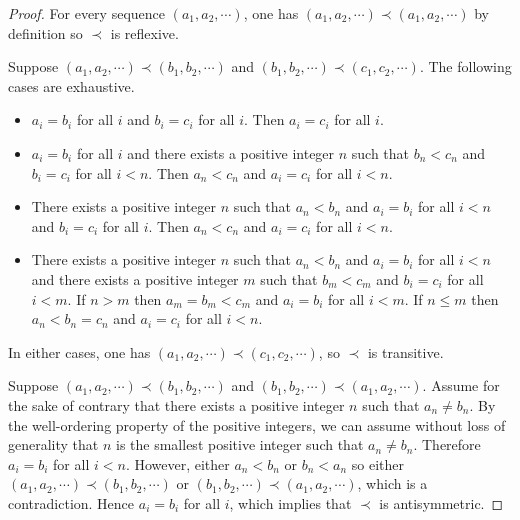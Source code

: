 \begin{proof}
	For every sequence \( (a_{1}, a_{2}, \cdots) \), one has \( (a_{1}, a_{2}, \cdots) \prec (a_{1}, a_{2}, \cdots) \) by definition so \( \prec \) is reflexive.

	Suppose \( (a_{1}, a_{2}, \cdots) \prec (b_{1}, b_{2}, \cdots) \) and \( (b_{1}, b_{2}, \cdots) \prec (c_{1}, c_{2}, \cdots) \). The following cases are exhaustive.
	\begin{itemize}
		\item \( a_{i} = b_{i} \) for all \( i \) and \( b_{i} = c_{i} \) for all \( i \). Then \( a_{i} = c_{i} \) for all \( i \).
		\item \( a_{i} = b_{i} \) for all \( i \) and there exists a positive integer \( n \) such that \( b_{n} < c_{n} \) and \( b_{i} = c_{i} \) for all \( i < n \). Then \( a_{n} < c_{n} \) and \( a_{i} = c_{i} \) for all \( i < n \).
		\item There exists a positive integer \( n \) such that \( a_{n} < b_{n} \) and \( a_{i} = b_{i} \) for all \( i < n \) and \( b_{i} = c_{i} \) for all \( i \). Then \( a_{n} < c_{n} \) and \( a_{i} = c_{i} \) for all \( i < n \).
		\item There exists a positive integer \( n \) such that \( a_{n} < b_{n} \) and \( a_{i} = b_{i} \) for all \( i < n \) and there exists a positive integer \( m \) such that \( b_{m} < c_{m} \) and \( b_{i} = c_{i} \) for all \( i < m \). If \( n > m \) then \( a_{m} = b_{m} < c_{m} \) and \( a_{i} = b_{i} \) for all \( i < m \). If \( n \le m \) then \( a_{n} < b_{n} = c_{n} \) and \( a_{i} = c_{i} \) for all \( i < n \).
	\end{itemize}

	In either cases, one has \( (a_{1}, a_{2}, \cdots) \prec (c_{1}, c_{2}, \cdots) \), so \( \prec \) is transitive.

	Suppose \( (a_{1}, a_{2}, \cdots) \prec (b_{1}, b_{2}, \cdots) \) and \( (b_{1}, b_{2}, \cdots) \prec (a_{1}, a_{2}, \cdots) \). Assume for the sake of contrary that there exists a positive integer \( n \) such that \( a_{n} \ne b_{n} \). By the well-ordering property of the positive integers, we can assume without loss of generality that \( n \) is the smallest positive integer such that \( a_{n} \ne b_{n} \). Therefore \( a_{i} = b_{i} \) for all \( i < n \). However, either \( a_{n} < b_{n} \) or \( b_{n} < a_{n} \) so either \( (a_{1}, a_{2}, \cdots) \prec (b_{1}, b_{2}, \cdots) \) or \( (b_{1}, b_{2}, \cdots) \prec (a_{1}, a_{2}, \cdots) \), which is a contradiction. Hence \( a_{i} = b_{i} \) for all \( i \), which implies that \( \prec \) is antisymmetric.


\end{proof}
